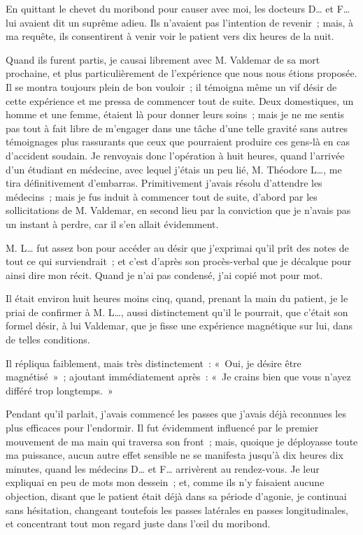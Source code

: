 \documentclass[french,twoside]{book} %
\begin{document}
En quittant le chevet du moribond pour causer avec moi, les docteurs D… et F… lui avaient dit un suprême adieu. Ils n’avaient pas l’intention de revenir ; mais, à ma requête, ils consentirent à venir voir le patient vers dix heures de la nuit.\par
Quand ils furent partis, je causai librement avec M. Valdemar de sa mort prochaine, et plus particulièrement de l’expérience que nous nous étions proposée. Il se montra toujours plein de bon vouloir ; il témoigna même un vif désir de cette expérience et me pressa de commencer tout de suite. Deux domestiques, un homme et une femme, étaient là pour donner leurs soins ; mais je ne me sentis pas tout à fait libre de m’engager dans une tâche d’une telle gravité sans autres témoignages plus rassurants que ceux que pourraient produire ces gens-là en cas d’accident soudain. Je renvoyais donc l’opération à huit heures, quand l’arrivée d’un étudiant en médecine, avec lequel j’étais un peu lié, M. Théodore L…, me tira définitivement d’embarras. Primitivement j’avais résolu d’attendre les médecins ; mais je fus induit à commencer tout de suite, d’abord par les sollicitations de M. Valdemar, en second lieu par la conviction que je n’avais pas un instant à perdre, car il s’en allait évidemment.\par
M. L… fut assez bon pour accéder au désir que j’exprimai qu’il prît des notes de tout ce qui surviendrait ; et c’est d’après son procès-verbal que je décalque pour ainsi dire mon récit. Quand je n’ai pas condensé, j’ai copié mot pour mot.\par
Il était environ huit heures moins cinq, quand, prenant la main du patient, je le priai de confirmer à M. L…, aussi distinctement qu’il le pourrait, que c’était son formel désir, à lui Valdemar, que je fisse une expérience magnétique sur lui, dans de telles conditions.\par
Il répliqua faiblement, mais très distinctement : « Oui, je désire être magnétisé » ; ajoutant immédiatement après : « Je crains bien que vous n’ayez différé trop longtemps. »\par
Pendant qu’il parlait, j’avais commencé les passes que j’avais déjà reconnues les plus efficaces pour l’endormir. Il fut évidemment influencé par le premier mouvement de ma main qui traversa son front ; mais, quoique je déployasse toute ma puissance, aucun autre effet sensible ne se manifesta jusqu’à dix heures dix minutes, quand les médecins D… et F… arrivèrent au rendez-vous. Je leur expliquai en peu de mots mon dessein ; et, comme ils n’y faisaient aucune objection, disant que le patient était déjà dans sa période d’agonie, je continuai sans hésitation, changeant toutefois les passes latérales en passes longitudinales, et concentrant tout mon regard juste dans l’œil du moribond.\par
\end{document}
